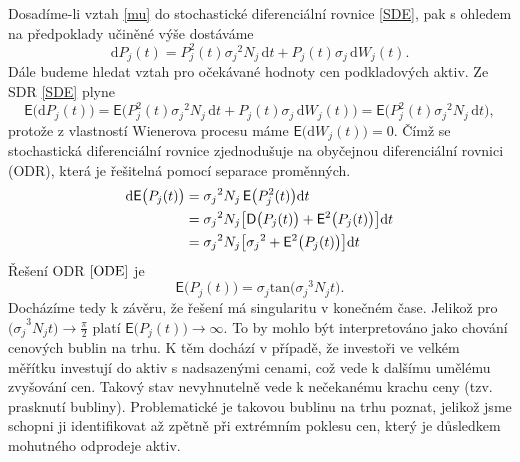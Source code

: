 \documentclass[a4paper,12pt]{report}
\theoremstyle{definition} \newtheorem{definice}[veta]{Definice}
\theoremstyle{remark}
\begin{document}
Dosadíme-li vztah \eqref{mu} do stochastické diferenciální rovnice \eqref{SDE}, pak s ohledem na předpoklady učiněné výše dostáváme
$$ 
\mathrm{d}P_j(t)=P_j^2(t){\sigma_{j}}^2N_j\,\mathrm{d}t+P_j(t)\sigma_{j}\,\mathrm{d}W_j(t).
$$
Dále budeme hledat vztah pro očekávané hodnoty cen podkladových aktiv.
Ze SDR \eqref{SDE} plyne
\begin{equation}
\mathsf{E}\big(\mathrm{d}P_j(t)\big)=\mathsf{E}\big(P_j^2(t){\sigma_{j}}^2N_j\,\mathrm{d}t+P_j(t)\sigma_{j}\,\mathrm{d}W_j(t)\big)=\mathsf{E}\big(P_j^2(t){\sigma_{j}}^2N_j\,\mathrm{d}t\big),
\end{equation}
protože z vlastností Wienerova procesu máme $\mathsf{E}\big(\mathrm{d}W_j(t)\big)=0$.
Čímž se stochastická diferenciální rovnice zjednodušuje na obyčejnou diferenciální rovnici (ODR), která je řešitelná pomocí separace proměnných.
\begin{align} 
{\mathrm{d}\mathsf{E}\big(P_j(t)\big)}&={\sigma_{j}}^2N_j\,\mathsf{E}\big(P_j^2(t)\big)\mathrm{d}t \notag\\
&={\sigma_{j}}^2N_j\big[\mathsf{D}\big(P_j(t)\big)+\mathsf{E}^2\big(P_j(t)\big)\big]\mathrm{d}t \notag\\
&={\sigma_{j}}^2N_j\big[{\sigma_{j}}^2+\mathsf{E}^2\big(P_j(t)\big)\big]\mathrm{d}t \label{ODE}
\end{align}  
Řešení ODR $\eqref{ODE}$ je
\begin{equation} 
\mathsf{E}\big(P_j(t)\big)=\sigma_j\mathrm{tan}\big({\sigma_j}^3N_jt\big).
\end{equation}
Docházíme tedy k závěru, že řešení má singularitu v konečném čase.
Jelikož pro ${\big(\sigma_j}^3N_jt\big)\to\frac\pi2$ platí $\mathsf{E}\big(P_j(t)\big)\to\infty$. 
To by mohlo být interpretováno jako chování cenových bublin na trhu.
K těm dochází v případě, že investoři ve velkém měřítku investují do aktiv s nadsazenými cenami, což vede k dalšímu umělému zvyšování cen. 
Takový stav nevyhnutelně vede k nečekanému krachu ceny (tzv. prasknutí bubliny).
Problematické je takovou bublinu na trhu poznat, jelikož jsme schopni ji identifikovat až zpětně při extrémním poklesu cen, který je důsledkem mohutného odprodeje aktiv.
\end{document}
